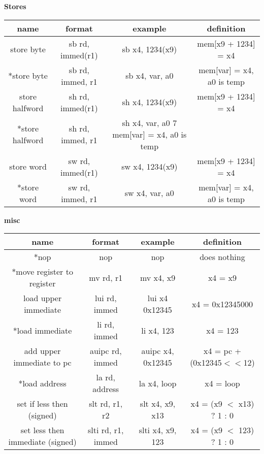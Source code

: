 \documentclass{article}
\begin{document}
\begin{center}
  \textbf{Stores}

  \begin{tabular}{|c|c|c|c|}
    \hline
    name            & format            & example          & definition \\
    \hline
    store byte & sb rd, immed(r1) & sb x4, 1234(x9) & mem[x9 + 1234] = x4 \\
    *store byte & sb rd, immed, r1 & sb x4, var, a0 & mem[var] = x4, a0 is temp\\
    store halfword & sh rd, immed(r1) & sh x4, 1234(x9) & mem[x9 + 1234] = x4 \\
    *store halfword & sh rd, immed, r1 & sh x4, var, a0 7 mem[var] = x4, a0 is temp\\
    store word & sw rd, immed(r1) & sw x4, 1234(x9) & mem[x9 + 1234] = x4 \\
    *store word & sw rd, immed, r1 & sw x4, var, a0 & mem[var] = x4, a0 is temp\\
    \hline
  \end{tabular}

  \textbf{misc}

  \begin{tabular}{|c|c|c|c|}
    \hline
    name                             & format             & example           & definition      \\
    \hline
    *nop                              & nop                & nop               & does nothing    \\
    *move register to register        & mv rd, r1          & mv x4, x9         & x4 = x9         \\
    load upper immediate             & lui rd, immed      & lui x4 0x12345    & x4 = 0x12345000
    \\
    *load immediate                   & li rd, immed       & li x4, 123        & x4 = 123
    \\
    add upper immediate to pc        & auipc rd, immed    & auipc x4, 0x12345 & x4 = pc +
    (0x12345$<<$12)                                                                             \\
    *load address                     & la rd, address     & la x4, loop       & x4 = loop
    \\
    set if less then (signed)        & slt rd, r1, r2     & slt x4, x9, x13   & x4 = (x9 $<$
    x13) ? 1 : 0                                                                                \\
    set less then immediate (signed) & slti rd, r1, immed & slti x4, x9, 123  &
    x4 = (x9 $<$ 123) ? 1 : 0                                                                   \\
    \hline
  \end{tabular}


\end{center}
\end{document}
